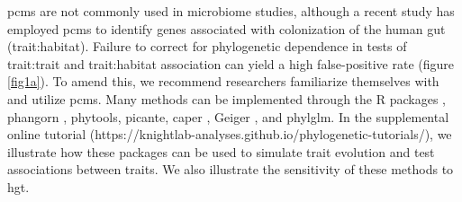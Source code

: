 \gls{pcm}s are not commonly used in microbiome studies, although a recent study\cite{bradley_phylogeny_correction} has employed \gls{pcm}s to identify genes associated with colonization of the human gut (trait:habitat). Failure to correct for phylogenetic dependence in tests of trait:trait and trait:habitat association can yield a high false-positive rate (figure \ref{fig1a}). To amend this, we recommend researchers familiarize themselves with and utilize \gls{pcm}s. Many methods can be implemented through the R packages \cite{ape} , phangorn \cite{phangorn}, phytools\cite{phytools}, picante\cite{picante}, caper \cite{caper}, Geiger \cite{geiger}, and phylglm\cite{phylglm}. In the supplemental online tutorial (https://knightlab-analyses.github.io/phylogenetic-tutorials/), we illustrate how these packages can be used to simulate trait evolution and test associations between traits. We also illustrate the sensitivity of these methods to \gls{hgt}.
